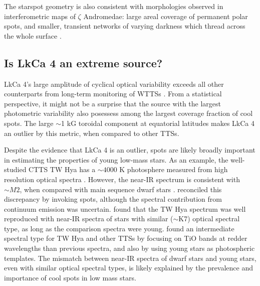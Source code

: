 \documentclass[twocolumn]{emulateapj}%
\newcommand{\name}{LkCa 4 }
\begin{document}
The starspot geometry is also consistent with morphologies observed in interferometric maps of $\zeta$ Andromedae: large areal coverage of permanent polar spots, and smaller, transient networks of varying darkness which thread across the whole surface \citep{roettenbacher16}.



\subsection{Is \name an extreme source?}
LkCa 4's large amplitude of cyclical optical variability exceeds all other counterparts from long-term monitoring of WTTSs \citep{grankin08}.  From a statistical perspective, it might not be a surprise that the source with the largest photometric variability also posessess among the largest coverage fraction of cool spots.  The large $\sim$1 kG toroidal component at equatorial latitudes makes LkCa 4 an outlier by this metric, when compared to other TTSs.



Despite the evidence that LkCa 4 is an outlier, spots are likely broadly important in estimating the properties of young low-mass stars. As an example, the well-studied CTTS TW Hya has a $\sim 4000$ K photosphere measured from high resolution optical spectra \citep[e.g.][]{yang05}.  However, the near-IR spectrum is consistent with $\sim M2$, when compared with main sequence dwarf stars \citep{vacca11}.  \citet{debes13} reconciled this discrepancy by invoking spots, although the spectral contribution from continuum emission was uncertain.  \citet{mcclure13} found that the TW Hya spectrum was well reproduced with near-IR spectra of stars with similar ($\sim$K7) optical spectral type, as long as the comparison spectra were young.   \citet{herczeg14} found an intermediate spectral type for TW Hya and other TTSs by focusing on TiO bands at redder wavelengths than previous spectra, and also by using young stars as photospheric templates.  The mismatch between near-IR spectra of dwarf stars and young stars, even with similar optical spectral types, is likely explained by the prevalence and importance of cool spots in low mass stars.
\end{document}
